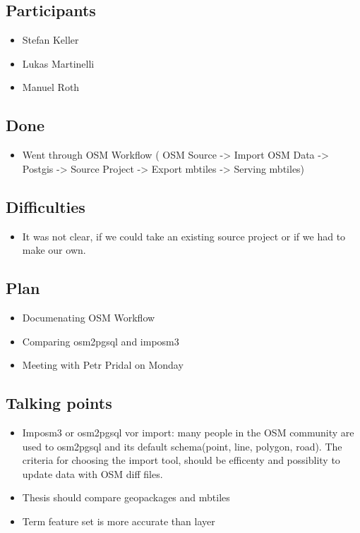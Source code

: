 \subsection*{Participants}

\begin{itemize}
  \item Stefan Keller
  \item Lukas Martinelli
  \item Manuel Roth
\end{itemize}


\subsection*{Done}

\begin{itemize}
  \item Went through OSM Workflow ( OSM Source -> Import OSM Data -> Postgis -> Source Project -> Export mbtiles -> Serving mbtiles)
\end{itemize}

\subsection*{Difficulties}

\begin{itemize}
  \item It was not clear, if we could take an existing source project or if we had to make our own.
\end{itemize}

\subsection*{Plan}

\begin{itemize}
  \item Documenating OSM Workflow
  \item Comparing osm2pgsql and imposm3
  \item Meeting with Petr Pridal on Monday
\end{itemize}

\subsection*{Talking points}

\begin{itemize}
  \item Imposm3 or osm2pgsql vor import: many people in the OSM community are used to osm2pgsql and its default schema(point, line, polygon, road). The criteria for choosing the import tool, should be efficenty and possiblity to update data with OSM diff files.
  \item Thesis should compare geopackages and mbtiles 
  \item Term feature set is more accurate than layer
\end{itemize}

